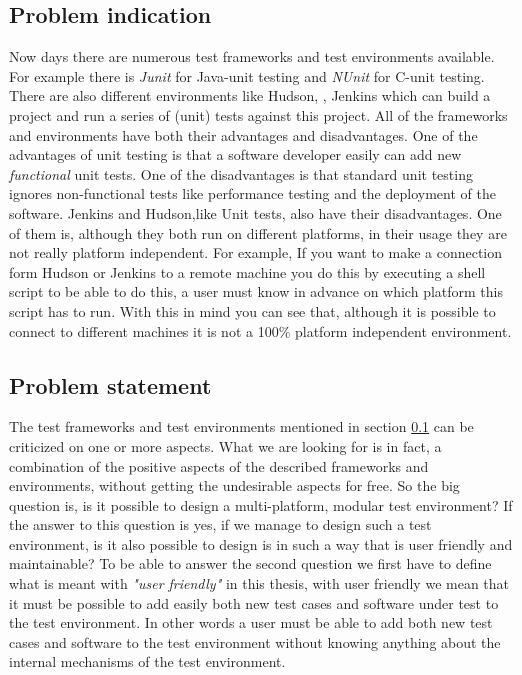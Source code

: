 \documentclass[a4paper,10pt]{scrartcl}
\newcommand{\CS}{C\nolinebreak\hspace{-.05em}\raisebox{.6ex}{\bf \#}}
\begin{document}
\subsection{Problem indication}
\label{subsec:Problemindication}
Now days there are numerous test frameworks and test environments available. For example there is \emph{Junit}\cite{Junit} for Java-unit testing and \emph{NUnit}\cite{Nunit} for \CS{}-unit testing.
There are also different environments like Hudson\cite{HudsonDoc}, \cite{Hudson}, Jenkins\cite{JenkinsDoc} which can build a project and run a series of (unit) tests against this project. 
All of the frameworks and environments have both their advantages and disadvantages. One of the advantages of unit testing is that a software developer easily can add new \emph{functional} unit tests.
One of the disadvantages is that standard unit testing ignores non-functional tests like performance testing and the deployment of the software. Jenkins and Hudson,like Unit tests, also have their
disadvantages. One of them is, although they both run on different platforms, in their usage they are not really platform independent. For example, If you want
to make a connection form Hudson or Jenkins to a remote machine you do this by executing a shell script to be able to do this, a user must know in advance on which platform this script has to run.
With this in mind you can see that, although it is possible to connect to different machines it is not a 100\% platform independent environment.
 
\subsection{Problem statement}
\label{subsec:Problemstatement}
The test frameworks and test environments mentioned in section \ref{subsec:Problemindication} can be criticized on one or more aspects. What we are looking for is in fact, a combination
of the positive aspects of the described frameworks and environments, without getting the undesirable aspects for free. So the big question is, is it possible to design a
multi-platform, modular test environment? If the answer to this question is yes, if we manage to design such a test environment, is it also possible to design is in such a way
that is user friendly and maintainable? To be able to answer the second question we first have to define what is meant with \emph{"user friendly"} in this thesis,
with user friendly we mean that it must be possible to add easily both new test cases and software under test to the test environment. In other words a user must be able
to add both new test cases and software to the test environment without knowing anything about the internal mechanisms of the test environment.\\
\end{document}
